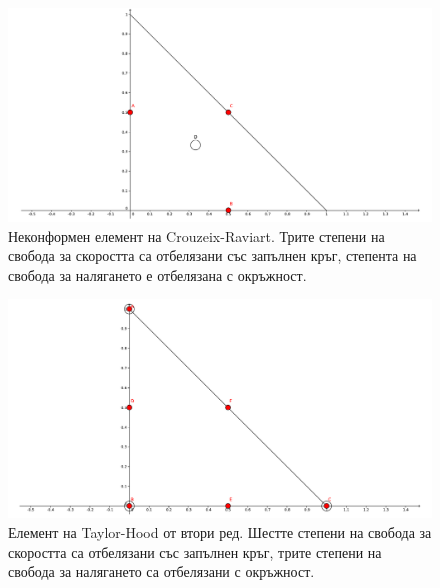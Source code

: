 \documentclass[12pt]{report}
\begin{document}
\begin{figure}[H]
  \centering
  \includegraphics[width=\textwidth]{Figures/01_introduction/cr_element.pdf}
  \caption{Неконформен елемент на Crouzeix-Raviart. Трите степени на свобода за скоростта са отбелязани със запълнен кръг, степента на свобода за налягането е отбелязана с окръжност.}\label{fig:P1P0-CR-Standard}
\end{figure}

\begin{figure}[H]
  \centering
  \includegraphics[width=\textwidth]{Figures/01_introduction/tylor_hood_element.pdf}
  \caption{Елемент на Taylor-Hood от втори ред. Шестте степени на свобода за скоростта са отбелязани със запълнен кръг, трите степени на свобода за налягането са отбелязани с окръжност.}\label{fig:P2P1-Standard}
\end{figure}
\end{document}
